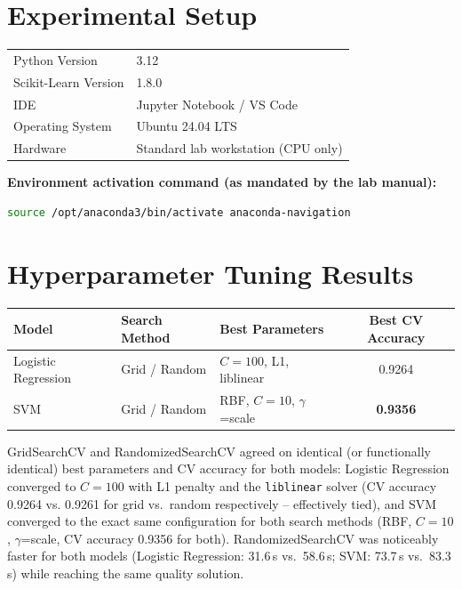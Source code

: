 \documentclass[12pt,a4paper]{article}
\newenvironment{fitwidth}
  {\begin{lrbox}{\fitbox}}
  {\end{lrbox}\ifdim\wd\fitbox>\linewidth\resizebox{\linewidth}{!}{\usebox{\fitbox}}\else\usebox{\fitbox}\fi}
\DeclareRobustCommand{\_}{\textunderscore\allowbreak}
\begin{document}
\section{Experimental Setup}
\begin{center}
\begin{minipage}{\linewidth}\centering
\begin{fitwidth}
\begin{tabular}{ll}
\toprule
Python Version & 3.12 \\
Scikit-Learn Version & 1.8.0 \\
IDE & Jupyter Notebook / VS Code \\
Operating System & Ubuntu 24.04 LTS \\
Hardware & Standard lab workstation (CPU only) \\
\bottomrule
\end{tabular}
\end{fitwidth}
\end{minipage}
\end{center}

\vspace{0.3cm}
\textbf{Environment activation command (as mandated by the lab manual):}
\begin{lstlisting}[language=bash]
source /opt/anaconda3/bin/activate anaconda-navigation
\end{lstlisting}

\section{Hyperparameter Tuning Results}

\begin{center}
\begin{minipage}{\linewidth}\centering
\begin{fitwidth}
\begin{tabular}{lllc}
\toprule
Model & Search Method & Best Parameters & Best CV Accuracy \\
\midrule
Logistic Regression & Grid / Random & $C=100$, L1, liblinear      & 0.9264 \\
SVM                  & Grid / Random & RBF, $C=10$, $\gamma$=scale & \textbf{0.9356} \\
\bottomrule
\end{tabular}
\end{fitwidth}
\end{minipage}
\end{center}

\vspace{0.2cm}
\noindent GridSearchCV and RandomizedSearchCV agreed on identical (or
functionally identical) best parameters and CV accuracy for both models:
Logistic Regression converged to $C=100$ with L1 penalty and the
\texttt{liblinear} solver (CV accuracy 0.9264 vs. 0.9261 for grid vs.\
random respectively -- effectively tied), and SVM converged to the exact
same configuration for both search methods (RBF, $C=10$, $\gamma$=scale,
CV accuracy 0.9356 for both). RandomizedSearchCV was noticeably faster for
both models (Logistic Regression: 31.6\,s vs.\ 58.6\,s; SVM: 73.7\,s vs.\
83.3\,s) while reaching the same quality solution.
\end{document}
